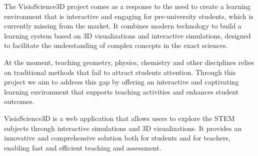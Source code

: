 The VisioScience3D project comes as a response to the need to create a learning environment 
that is interactive and engaging for pre-university students, which is currently missing from
the market. It combines modern technology to build a learning system based on 3D visualizations 
and interactive simulations, designed to facilitate the understanding of complex concepts in 
the exact sciences.


At the moment, teaching geometry, physics, chemistry and other disciplines relies on 
traditional methods that fail to attract students attention. Through this project we aim to 
address this gap by offering an interactive and captivating learning environment that supports 
teaching activities and enhances student outcomes.

VisioScience3D is a web application that allows users to explore the STEM subjects through
interactive simulations and 3D visualizations. It provides an innovative and comprehensive 
solution both for students and for teachers, enabling fast and efficient teaching and
assessment.